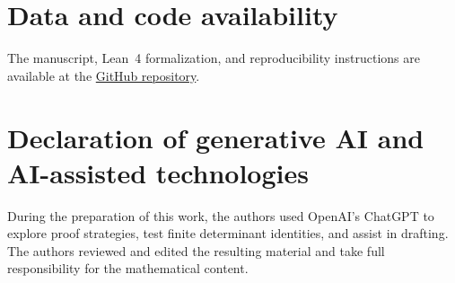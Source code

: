 \documentclass[11pt]{amsart}
\theoremstyle{definition}
\theoremstyle{remark}
\begin{document}
\section*{Data and code availability}
The manuscript, Lean~4 formalization, and reproducibility instructions are available at
the \href{https://github.com/Cheng-Yaoyu/toeplitz-positroids-truncations-boundary-charts-formalization}{GitHub repository}.

\section*{Declaration of generative AI and AI-assisted technologies}
During the preparation of this work, the authors used OpenAI's ChatGPT to explore proof strategies, test finite determinant identities, and assist in drafting.  The authors reviewed and edited the resulting material and take full responsibility for the mathematical content.
\end{document}
